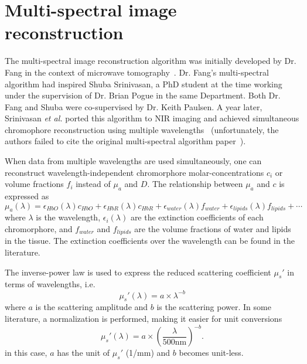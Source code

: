 \documentclass[12pt]{book}               %
\begin{document}
\section{Multi-spectral image reconstruction}
The multi-spectral image reconstruction algorithm was initially developed by Dr. Fang in the context of microwave tomography~\cite{Fang2004a, FangThesis}. Dr. Fang's multi-spectral algorithm had inspired Shuba Srinivasan, a PhD student at the time working under the supervision of Dr. Brian Pogue in the same Department. Both Dr. Fang and Shuba were co-supervised by Dr. Keith Paulsen. A year later, Srinivasan \emph{et al.} ported this algorithm to NIR imaging and achieved simultaneous chromophore reconstruction using multiple wavelengths~\cite{Srinivasan2025} (unfortunately, the authors failed to cite the original multi-spectral algorithm paper~\cite{Fang2004a}).

When data from multiple wavelengths are used simultaneously, one can reconstruct wavelength-independent chromorphore molar-concentrations $c_i$ or volume fractions $f_i$ instead of $\mu_a$ and $D$. The relationship between $\mu_a$ and $c$ is expressed as
\begin{equation}
\mu_a(\lambda)=\epsilon_{HbO}(\lambda)c_{HbO}+\epsilon_{HbR}(\lambda)c_{HbR}+\epsilon_{water}(\lambda)f_{water}+\epsilon_{lipids}(\lambda)f_{lipids}+ \cdots
\end{equation}
where $\lambda$ is the wavelength, $\epsilon_i(\lambda)$ are the extinction coefficients of each chromorphore, and $f_{water}$ and $f_{lipids}$ are the volume fractions of water and lipids in the tissue. The extinction coefficients over the wavelength can be found in the literature. 

The inverse-power law is used to express the reduced scattering coefficient $\mu_s'$ in terms of wavelengths, i.e.
\begin{equation}
\mu_s'(\lambda)=a\times\lambda^{-b}
\end{equation}
where $a$ is the scattering amplitude and $b$ is the scattering power. In some literature, a normalization is performed, making it easier for unit conversions
\begin{equation}
\mu_s'(\lambda)=a\times\left(\frac{\lambda}{500 \mathrm{nm}}\right)^{-b}.
\end{equation}
in this case, $a$ has the unit of $\mu_s'$ (1/mm) and $b$ becomes unit-less.
\end{document}
